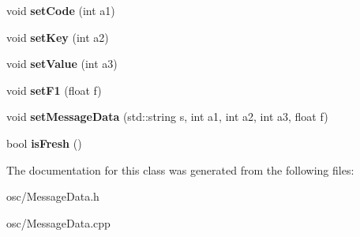 \begin{DoxyCompactItemize}
\item 
void {\bfseries set\+Code} (int a1)\hypertarget{classMessageData_a8639583a844208ccae9568bb68d1e547}{}\label{classMessageData_a8639583a844208ccae9568bb68d1e547}

\item 
void {\bfseries set\+Key} (int a2)\hypertarget{classMessageData_a54a0ddfb44fba671ba243914b037e231}{}\label{classMessageData_a54a0ddfb44fba671ba243914b037e231}

\item 
void {\bfseries set\+Value} (int a3)\hypertarget{classMessageData_a24e273f0a4443505ccf6222405cfb567}{}\label{classMessageData_a24e273f0a4443505ccf6222405cfb567}

\item 
void {\bfseries set\+F1} (float f)\hypertarget{classMessageData_a94dce06ace95a93c075dbaf253e559fe}{}\label{classMessageData_a94dce06ace95a93c075dbaf253e559fe}

\item 
void {\bfseries set\+Message\+Data} (std\+::string s, int a1, int a2, int a3, float f)\hypertarget{classMessageData_a9eb7741e4216075b0e03c554d83e35ae}{}\label{classMessageData_a9eb7741e4216075b0e03c554d83e35ae}

\item 
bool {\bfseries is\+Fresh} ()\hypertarget{classMessageData_a169f4e7ec5a0eb896cfccd8186b5fe8d}{}\label{classMessageData_a169f4e7ec5a0eb896cfccd8186b5fe8d}

\end{DoxyCompactItemize}


The documentation for this class was generated from the following files\+:\begin{DoxyCompactItemize}
\item 
osc/Message\+Data.\+h\item 
osc/Message\+Data.\+cpp\end{DoxyCompactItemize}
